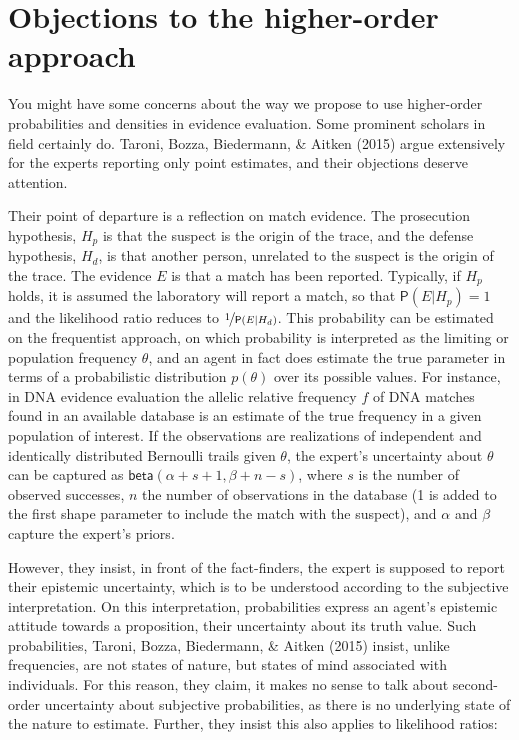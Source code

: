 \documentclass[
  10pt,
  dvipsnames,enabledeprecatedfontcommands]{scrartcl}
\newcommand{\pr}[1]{\mathsf{P}(#1)}
\newcommand{\s}[1]{\mbox{$\mathsf{#1}$}}
\begin{document}

\hypertarget{objections-to-the-higher-order-approach}{%
\section{Objections to the higher-order
approach}\label{objections-to-the-higher-order-approach}}

You might have some concerns about the way we propose to use
higher-order probabilities and densities in evidence evaluation. Some
prominent scholars in field certainly do. Taroni, Bozza, Biedermann, \&
Aitken (2015) argue extensively for the experts reporting only point
estimates, and their objections deserve attention.

Their point of departure is a reflection on match evidence. The
prosecution hypothesis, \(H_p\) is that the suspect is the origin of the
trace, and the defense hypothesis, \(H_d\), is that another person,
unrelated to the suspect is the origin of the trace. The evidence \(E\)
is that a match has been reported. Typically, if \(H_p\) holds, it is
assumed the laboratory will report a match, so that
\(\pr{E\vert H_p}=1\) and the likelihood ratio reduces to
\(\nicefrac{1}{\pr{E \vert H_d}}\). This probability can be estimated on
the frequentist approach, on which probability is interpreted as the
limiting or population frequency \(\theta\), and an agent in fact does
estimate the true parameter in terms of a probabilistic distribution
\(p(\theta)\) over its possible values. For instance, in DNA evidence
evaluation the allelic relative frequency \(f\) of DNA matches found in
an available database is an estimate of the true frequency in a given
population of interest. If the observations are realizations of
independent and identically distributed Bernoulli trails given
\(\theta\), the expert's uncertainty about \(\theta\) can be captured as
\(\s{beta}(\alpha + s + 1 ,\beta + n - s)\), where \(s\) is the number
of observed successes, \(n\) the number of observations in the database
(1 is added to the first shape parameter to include the match with the
suspect), and \(\alpha\) and \(\beta\) capture the expert's priors.

However, they insist, in front of the fact-finders, the expert is
supposed to report their epistemic uncertainty, which is to be
understood according to the subjective interpretation. On this
interpretation, probabilities express an agent's epistemic attitude
towards a proposition, their uncertainty about its truth value. Such
probabilities, Taroni, Bozza, Biedermann, \& Aitken (2015) insist,
unlike frequencies, are not states of nature, but states of mind
associated with individuals. For this reason, they claim, it makes no
sense to talk about second-order uncertainty about subjective
probabilities, as there is no underlying state of the nature to
estimate. Further, they insist this also applies to likelihood ratios:
\end{document}

